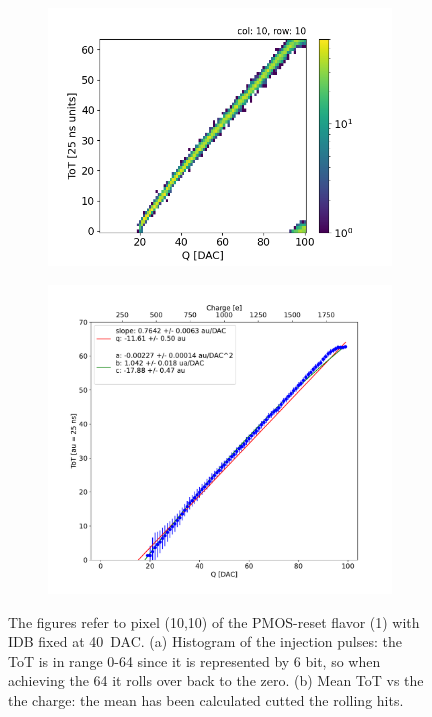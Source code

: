         \begin{figure}[h!]
            \begin{subfigure}{.5\textwidth}
            \centering
            \includegraphics[width=.98\linewidth]{figures/charaterization/ToT_rollover.png}            
            \end{subfigure}
            \begin{subfigure}{.5\textwidth}
            \centering
            \includegraphics[width=.98\linewidth]{figures/charaterization/ToT_injection.pdf}
            \end{subfigure}
            \label{fig:ToT_vs_charge}
            \caption{The figures refer to pixel (10,10) of the PMOS-reset flavor (1) with IDB fixed at \SI{40}{DAC}. (a) Histogram of the injection pulses: the ToT is in range 0-64 since it is represented by 6 bit, so when achieving the 64 it rolls over back to the zero. (b) Mean ToT vs the the charge: the mean has been calculated cutted the rolling hits. }
        \end{figure}    


